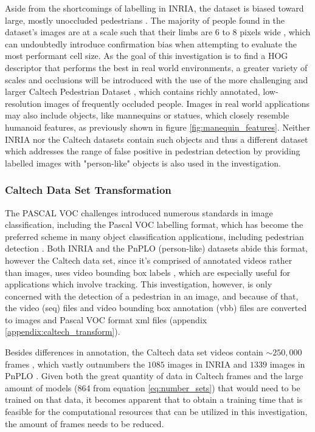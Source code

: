 Aside from the shortcomings of labelling in INRIA, the dataset is biased toward large, mostly unoccluded pedestrians \cite{dollar_2009_pedestrian}. The majority of people found in the dataset’s images are at a scale such that their limbs are 6 to 8 pixels wide \cite{dalal_2005_histograms}, which can undoubtedly introduce confirmation bias when attempting to evaluate the most performant cell size. As the goal of this investigation is to find a HOG descriptor that performs the best in real world environments, a greater variety of scales and occlusions will be introduced with the use of the more challenging and larger Caltech Pedestrian Dataset \cite{dollar_2009_pedestrian}, which contains richly annotated, low-resolution images of frequently occluded people. Images in real world applications may also include objects, like mannequins or statues, which closely resemble humanoid features, as previously shown in figure \ref{fig:manequin_features}. Neither INRIA nor the Caltech datasets contain such objects and thus a different dataset which addresses the range of false positive in pedestrian detection by providing labelled images with "person-like" objects \cite{karthika_2020_addressing} is also used in the investigation.

\subsubsection{Caltech Data Set Transformation}\label{sec:caltech_trasnform}

The PASCAL VOC challenges \cite{everingham_2009_pascal} introduced numerous standards in image classification, including the Pascal VOC labelling format, which has become the preferred scheme in many object classification applications, including pedestrian detection \cite{dollar_2012_pedestrian}. Both INRIA and the PnPLO (person-like) datasets abide this format, however the Caltech data set, since it's comprised of annotated videos rather than images, uses video bounding box labels \cite{mathworks_vbbLabeler}, which are especially useful for applications which involve tracking. This investigation, however, is only concerned with the detection of a pedestrian in an image, and because of that, the video (seq) files and video bounding box annotation (vbb) files are converted to images and Pascal VOC format xml files (appendix \ref{appendix:caltech_transform}). 

Besides differences in annotation, the Caltech data set videos contain $\sim 250,000$ frames \cite{dollar_2009_pedestrian}, which vastly outnumbers the $1085$ images in INRIA \cite{dalal_2005_histograms} and $1339$ images in PnPLO \cite{karthika_2020_addressing}. Given both the great quantity of data in Caltech frames and the large amount of models (864 from equation \ref{eq:number_sets}) that would need to be trained on that data, it becomes apparent that to obtain a training time that is feasible for the computational resources that can be utilized in this investigation, the amount of frames needs to be reduced. 

